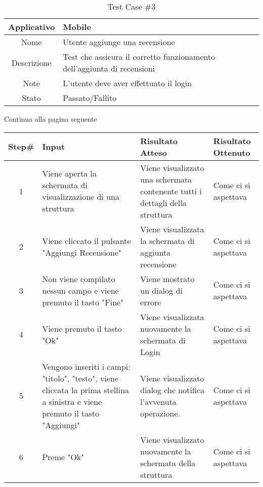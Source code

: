 
\begin{table}[H]
    \centering
    \footnotesize
    \caption{Test Case \#3}
    \begin{tabularx}{\textwidth}{|c|X|}
        \hline
        Applicativo & Mobile\\
        \hline
        Nome & Utente aggiunge una recensione  \\
        \hline
        Descrizione & Test che assicura il corretto funzionamento dell'aggiunta di recensioni\\
        \hline
        Note &  L'utente deve aver effettuato il login\\
        \hline
        Stato & Passato/Fallito\\
        \hline

    \end{tabularx}
    Continua alla pagina seguente
    \setlength{\tabcolsep}{8pt}
    \renewcommand{\arraystretch}{1.5}
\end{table}
\begin{table}[H]
    \footnotesize
    \begin{tabularx}{\textwidth}{|c|X|X|X|}
        \hline
        Step\# & Input & Risultato Atteso & Risultato Ottenuto \\
        \hline
         1 & Viene aperta la schermata di visualizzazione di una struttura
         & Viene visualizzato una schermata contenente tutti i dettagli della struttura
         &Come ci si aspettava \\
          \hline
        2 & Viene cliccato il pulsante "Aggiungi Recensione"
        & Viene visualizzata la schermata di aggiunta recensione
        & Come ci si aspettava\\
         \hline 
        3 & Non viene compilato nessun campo e viene premuto il tasto "Fine"
         & Viene mostrato un dialog di errore & Come ci si aspettava\\
          \hline
        4 & Viene premuto il tasto "Ok"
         & Viene visualizzata nuovamente la schermata di Login
         & Come ci si aspettava\\
          \hline 
          5 & Vengono inseriti i campi: "titolo", "testo", viene cliccata la prima stellina a sinistra e viene premuto il tasto "Aggiungi"
         & Viene visualizzato dialog che notifica l'avvenuta operazione.
         & Come ci si aspettava\\
          \hline 
          6 & Preme "Ok"
          & Viene visualizzato nuovamente la schermata della struttura
          & Come ci si aspettava\\
           \hline                     
    \end{tabularx}
\end{table}
    
       
